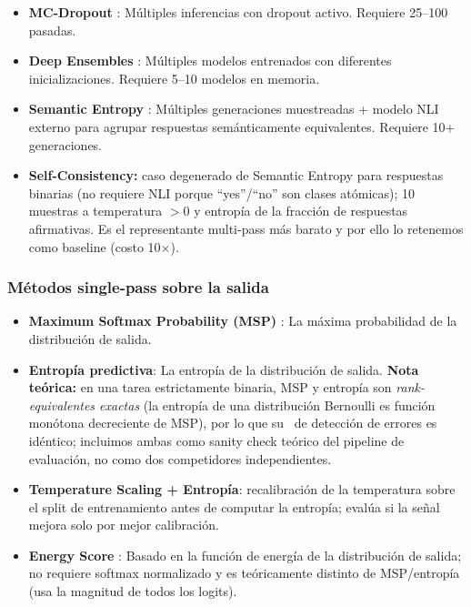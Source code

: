 \documentclass[12pt,a4paper]{article}
\newcommand{\AUROC}{\mathrm{AUROC}}
\begin{document}
\begin{itemize}[leftmargin=2em]
    \item \textbf{MC-Dropout} \citep{gal2016dropout}: Múltiples inferencias con dropout activo.
    Requiere 25--100 pasadas.

    \item \textbf{Deep Ensembles} \citep{lakshminarayanan2017ensembles}: Múltiples modelos entrenados con diferentes inicializaciones.
    Requiere 5--10 modelos en memoria.

    \item \textbf{Semantic Entropy} \citep{kuhn2023semantic}: Múltiples generaciones muestreadas + modelo NLI externo para agrupar respuestas semánticamente equivalentes.
    Requiere 10+ generaciones.

    \item \textbf{Self-Consistency:} caso degenerado de Semantic Entropy para respuestas binarias (no requiere NLI porque ``yes''/``no'' son clases atómicas); 10 muestras a temperatura $>0$ y entropía de la fracción de respuestas afirmativas.
    Es el representante multi-pass más barato y por ello lo retenemos como baseline (costo 10$\times$).
\end{itemize}

\subsubsection{Métodos single-pass sobre la salida}

\begin{itemize}[leftmargin=2em]
    \item \textbf{Maximum Softmax Probability (MSP)} \citep{hendrycks2017baseline}: La máxima probabilidad de la distribución de salida.

    \item \textbf{Entropía predictiva}: La entropía de la distribución de salida.
    \textbf{Nota teórica:} en una tarea estrictamente binaria, MSP y entropía son \emph{rank-equivalentes exactas} (la entropía de una distribución Bernoulli es función monótona decreciente de MSP), por lo que su \AUROC\ de detección de errores es idéntico; incluimos ambas como sanity check teórico del pipeline de evaluación, no como dos competidores independientes.

    \item \textbf{Temperature Scaling + Entropía}: recalibración de la temperatura sobre el split de entrenamiento antes de computar la entropía; evalúa si la señal mejora solo por mejor calibración.

    \item \textbf{Energy Score} \citep{liu2020energy}: Basado en la función de energía de la distribución de salida; no requiere softmax normalizado y es teóricamente distinto de MSP/entropía (usa la magnitud de todos los logits).
\end{itemize}
\end{document}
